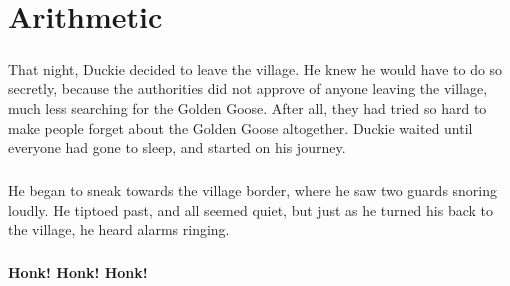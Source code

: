 \chapter{Arithmetic}
\paragraph{} That night, Duckie decided to leave the village. He knew he would have to do so secretly, because the authorities did not approve of anyone leaving the village, much less searching for the Golden Goose. After all, they had tried so hard to make people forget about the Golden Goose altogether. Duckie waited until everyone had gone to sleep, and started on his journey.
\paragraph{} He began to sneak towards the village border, where he saw two guards snoring loudly. He tiptoed past, and all seemed quiet, but just as he turned his back to the village, he heard alarms ringing. 
\paragraph{} \textbf{Honk! Honk! Honk!}
